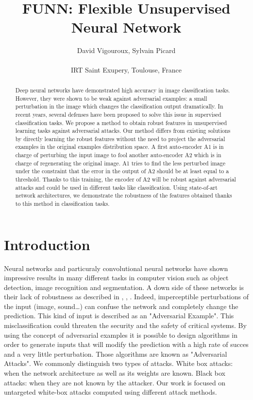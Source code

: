 \documentclass[12pt]{article}
\title{FUNN: Flexible Unsupervised Neural Network}
\author{David Vigouroux, Sylvain Picard\\
\\
\normalsize{IRT Saint Exupery, Toulouse, France}}
\date{}
\begin{document}
 


\baselineskip24pt


\maketitle 


\justify
\begin{abstract}
Deep neural networks have demonstrated high accuracy in image classification tasks. However, they were shown to be weak against adversarial examples: a small perturbation in the image which changes the classification output dramatically. In recent years, several defenses have been proposed to solve this issue in supervised classification tasks. We propose a method to obtain robust features in unsupervised learning tasks against adversarial attacks. Our method differs from existing solutions by directly learning the robust features without the need to project the adversarial examples in the original examples distribution space. A first auto-encoder A1 is in charge of perturbing the input image to fool another auto-encoder A2 which is in charge of regenerating the original image. A1 tries to find the less perturbed image under the constraint that the error in the output of A2 should be at least equal to a threshold. Thanks to this training, the encoder of A2 will be robust against adversarial attacks and could be used in different tasks like classification. Using state-of-art network architectures, we demonstrate the robustness of the features obtained thanks to this method in classification tasks.
\end{abstract}




\section{Introduction}
\paragraph{}
Neural networks and particuraly convolutional neural networks have shown impressive results in many different tasks in computer vision such as object detection, image recognition and segmentation. A down side of these networks is their lack of robustness as described in  \cite{goodfellow_explaining_2014}, \cite{kurakin_adversarial_2016-1}, \cite{szegedy_intriguing_2013}.
Indeed, imperceptible perturbations of the input (image, sound…) can confuse the network and completely change the prediction. This kind of input is described as an "Adversarial Example". This misclassification could threaten the security and the safety of critical systems. By using the concept of adversarial examples it is possible to design algorithms in order to generate inputs that will modify the prediction with a high rate of succes and a very little perturbation. Those algorithms are known as "Adversarial Attacks". We commonly distinguish two types of attacks. White box attacks: when the network architecture as well as its weights are known. Black box attacks: when they are not known by the attacker. Our work is focused on  untargeted  white-box  attacks computed  using  different attack methods.
\end{document}
